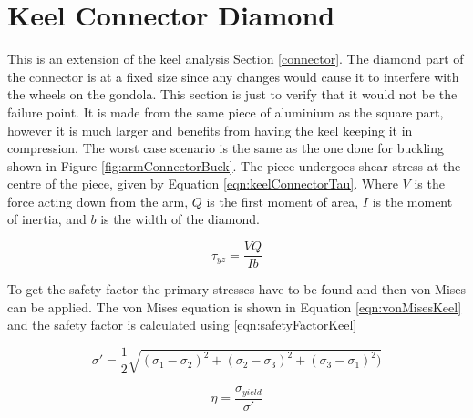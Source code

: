 \documentclass[../main.tex]{subfiles}
\begin{document}
\section{Keel Connector Diamond}
This is an extension of the keel analysis Section \ref{connector}. The diamond part of the connector is at a fixed size since any changes would cause it to interfere with the wheels on the gondola. This section is just to verify that it would not be the failure point. It is made from the same piece of aluminium as the square part, however it is much larger and benefits from having the keel keeping it in compression. The worst case scenario is the same as the one done for buckling shown in Figure \ref{fig:armConnectorBuck}. The piece undergoes shear stress at the centre of the piece, given by Equation \ref{eqn:keelConnectorTau}. Where $V$ is the force acting down from the arm, $Q$ is the first moment of area, $I$ is the moment of inertia, and $b$ is the width of the diamond.

\begin{equation} \label{eqn:keelConnectorTau}
\tau_{yz} = \frac{VQ}{Ib}
\end{equation}

To get the safety factor the primary stresses have to be found and then von Mises \cite[216]{Shigley} can be applied. The von Mises equation is shown in Equation \ref{eqn:vonMisesKeel} and the safety factor is calculated using \ref{eqn:safetyFactorKeel}

\begin{equation} \label{eqn:vonMisesKeel}
\sigma' = \frac{1}{2}\sqrt{(\sigma_1 - \sigma_2)^2 + (\sigma_2 - \sigma_3)^2 + (\sigma_3 - \sigma_1)^2)}
\end{equation}

\begin{equation} \label{eqn:safetyFactorKeel}
\eta = \frac{\sigma_{yield}}{\sigma'}
\end{equation}
\end{document}
